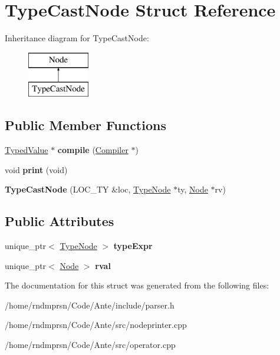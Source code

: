 \hypertarget{structTypeCastNode}{}\section{Type\+Cast\+Node Struct Reference}
\label{structTypeCastNode}
Inheritance diagram for Type\+Cast\+Node\+:\begin{figure}[H]
\begin{center}
\leavevmode
\includegraphics[height=2.000000cm]{structTypeCastNode}
\end{center}
\end{figure}
\subsection*{Public Member Functions}
\begin{DoxyCompactItemize}
\item 
\mbox{\label{structTypeCastNode_abbca164252a01742e49a6f5c5f01986d}} 
\hyperlink{structTypedValue}{Typed\+Value} $\ast$ {\bfseries compile} (\hyperlink{structante_1_1Compiler}{Compiler} $\ast$)
\item 
\mbox{\label{structTypeCastNode_a3bcf4918d611f6c22ee3c7c9f008edc5}} 
void {\bfseries print} (void)
\item 
\mbox{\label{structTypeCastNode_ac5d766461431f4bc318e6a6b694e194c}} 
{\bfseries Type\+Cast\+Node} (L\+O\+C\+\_\+\+TY \&loc, \hyperlink{structTypeNode}{Type\+Node} $\ast$ty, \hyperlink{structNode}{Node} $\ast$rv)
\end{DoxyCompactItemize}
\subsection*{Public Attributes}
\begin{DoxyCompactItemize}
\item 
\mbox{\label{structTypeCastNode_a565392d66f6c5962699f794f6aada817}} 
unique\+\_\+ptr$<$ \hyperlink{structTypeNode}{Type\+Node} $>$ {\bfseries type\+Expr}
\item 
\mbox{\label{structTypeCastNode_af4420ccf63d9311f3be4e1b47f9a6005}} 
unique\+\_\+ptr$<$ \hyperlink{structNode}{Node} $>$ {\bfseries rval}
\end{DoxyCompactItemize}


The documentation for this struct was generated from the following files\+:\begin{DoxyCompactItemize}
\item 
/home/rndmprsn/\+Code/\+Ante/include/parser.\+h\item 
/home/rndmprsn/\+Code/\+Ante/src/nodeprinter.\+cpp\item 
/home/rndmprsn/\+Code/\+Ante/src/operator.\+cpp\end{DoxyCompactItemize}

